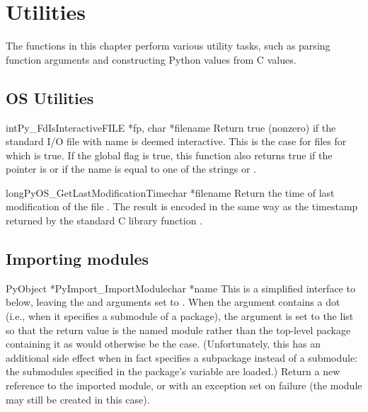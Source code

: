 \documentclass[twoside]{report}
\begin{document}
\chapter{Utilities}

The functions in this chapter perform various utility tasks, such as
parsing function arguments and constructing Python values from C
values.

\section{OS Utilities}

\begin{cfuncdesc}{int}{Py_FdIsInteractive}{FILE *fp, char *filename}
Return true (nonzero) if the standard I/O file  with name
 is deemed interactive.  This is the case for files for
which  is true.  If the global flag
 is true, this function also returns true if
the  pointer is \NULL{} or if the name is equal to one of
the strings  or .
\end{cfuncdesc}

\begin{cfuncdesc}{long}{PyOS_GetLastModificationTime}{char *filename}
Return the time of last modification of the file .
The result is encoded in the same way as the timestamp returned by
the standard C library function .
\end{cfuncdesc}


\section{Importing modules}

\begin{cfuncdesc}{PyObject *}{PyImport_ImportModule}{char *name}
This is a simplified interface to 
below, leaving the  and  arguments set to
\NULL{}.  When the  argument contains a dot (i.e., when
it specifies a submodule of a package), the  argument is
set to the list \code{['*']} so that the return value is the named
module rather than the top-level package containing it as would
otherwise be the case.  (Unfortunately, this has an additional side
effect when  in fact specifies a subpackage instead of a
submodule: the submodules specified in the package's 
variable are loaded.)  Return a new reference to the imported module,
or \NULL{} with an exception set on failure (the module may still
be created in this case).
\end{cfuncdesc}
\end{document}
